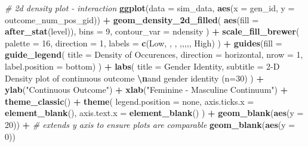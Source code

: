 \documentclass[
]{book}
\newenvironment{Shaded}{\begin{snugshade}}{\end{snugshade}}
\newcommand{\AttributeTok}[1]{\textcolor[rgb]{0.13,0.29,0.53}{#1}}
\newcommand{\CommentTok}[1]{\textcolor[rgb]{0.56,0.35,0.01}{\textit{#1}}}
\newcommand{\DecValTok}[1]{\textcolor[rgb]{0.00,0.00,0.81}{#1}}
\newcommand{\FunctionTok}[1]{\textcolor[rgb]{0.13,0.29,0.53}{\textbf{#1}}}
\newcommand{\NormalTok}[1]{#1}
\newcommand{\SpecialCharTok}[1]{\textcolor[rgb]{0.81,0.36,0.00}{\textbf{#1}}}
\newcommand{\StringTok}[1]{\textcolor[rgb]{0.31,0.60,0.02}{#1}}
\begin{document}
\begin{Shaded}
\begin{Highlighting}[]
\CommentTok{\# 2d density plot {-} interaction}
\FunctionTok{ggplot}\NormalTok{(}\AttributeTok{data =}\NormalTok{ sim\_data, }\FunctionTok{aes}\NormalTok{(}\AttributeTok{x =}\NormalTok{ gen\_id, }\AttributeTok{y =}\NormalTok{ outcome\_num\_pos\_gid)) }\SpecialCharTok{+} 
  \FunctionTok{geom\_density\_2d\_filled}\NormalTok{(}
    \FunctionTok{aes}\NormalTok{(}\AttributeTok{fill =} \FunctionTok{after\_stat}\NormalTok{(level)), }\AttributeTok{bins =} \DecValTok{9}\NormalTok{, }\AttributeTok{contour\_var =} \StringTok{\textquotesingle{}ndensity\textquotesingle{}}
\NormalTok{    ) }\SpecialCharTok{+}
  \FunctionTok{scale\_fill\_brewer}\NormalTok{(}
    \AttributeTok{palette =} \DecValTok{16}\NormalTok{, }\AttributeTok{direction =} \DecValTok{1}\NormalTok{, }
    \AttributeTok{labels =} \FunctionTok{c}\NormalTok{(}\StringTok{\textquotesingle{}Low\textquotesingle{}}\NormalTok{, }\StringTok{\textquotesingle{}\textquotesingle{}}\NormalTok{, }\StringTok{\textquotesingle{}\textquotesingle{}}\NormalTok{, }\StringTok{\textquotesingle{}\textquotesingle{}}\NormalTok{,}\StringTok{\textquotesingle{}\textquotesingle{}}\NormalTok{,}\StringTok{\textquotesingle{}\textquotesingle{}}\NormalTok{,}\StringTok{\textquotesingle{}\textquotesingle{}}\NormalTok{,}\StringTok{\textquotesingle{}\textquotesingle{}}\NormalTok{, }\StringTok{\textquotesingle{}High\textquotesingle{}}\NormalTok{)}
\NormalTok{    ) }\SpecialCharTok{+}
  \FunctionTok{guides}\NormalTok{(}\AttributeTok{fill =} \FunctionTok{guide\_legend}\NormalTok{(}
    \AttributeTok{title =} \StringTok{\textquotesingle{}Density of Occurences\textquotesingle{}}\NormalTok{, }
    \AttributeTok{direction =} \StringTok{\textquotesingle{}horizontal\textquotesingle{}}\NormalTok{, }\AttributeTok{nrow =} \DecValTok{1}\NormalTok{, }
    \AttributeTok{label.position =} \StringTok{\textquotesingle{}bottom\textquotesingle{}}\NormalTok{)}
\NormalTok{    ) }\SpecialCharTok{+}
  \FunctionTok{labs}\NormalTok{(}
    \AttributeTok{title =} \StringTok{\textquotesingle{}Gender Identity\textquotesingle{}}\NormalTok{,}
    \AttributeTok{subtitle =} \StringTok{\textquotesingle{}2{-}D Density plot of continuous outcome }\SpecialCharTok{\textbackslash{}n}\StringTok{and gender identity (n=30)\textquotesingle{}}
\NormalTok{    ) }\SpecialCharTok{+}
  \FunctionTok{ylab}\NormalTok{(}\StringTok{"Continuous Outcome"}\NormalTok{) }\SpecialCharTok{+} \FunctionTok{xlab}\NormalTok{(}\StringTok{"Feminine {-} Masculine Continuum"}\NormalTok{) }\SpecialCharTok{+}
  \FunctionTok{theme\_classic}\NormalTok{() }\SpecialCharTok{+}
  \FunctionTok{theme}\NormalTok{(}
    \AttributeTok{legend.position =} \StringTok{\textquotesingle{}none\textquotesingle{}}\NormalTok{,}
    \AttributeTok{axis.ticks.x =} \FunctionTok{element\_blank}\NormalTok{(),}
    \AttributeTok{axis.text.x =} \FunctionTok{element\_blank}\NormalTok{()}
\NormalTok{  ) }\SpecialCharTok{+}
  \FunctionTok{geom\_blank}\NormalTok{(}\FunctionTok{aes}\NormalTok{(}\AttributeTok{y =} \DecValTok{20}\NormalTok{)) }\SpecialCharTok{+} \CommentTok{\# extends y axis to ensure plots are comparable}
  \FunctionTok{geom\_blank}\NormalTok{(}\FunctionTok{aes}\NormalTok{(}\AttributeTok{y =} \DecValTok{0}\NormalTok{))}


\end{Highlighting}
\end{Shaded}
\end{document}
